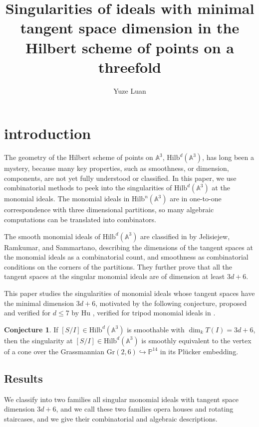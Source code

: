 \documentclass{amsart}[10pt]
\title{Singularities of ideals with minimal tangent space dimension in the Hilbert scheme of points on a threefold}
\author{Yuze Luan}
\theoremstyle{plain}
\theoremstyle{definition}
\newtheorem{conjecture}[theorem]{Conjecture}
\newcommand{\Hilb}{\mathrm{Hilb}}
\begin{document}
\maketitle


\section{introduction}
The geometry of the Hilbert scheme of points on $\mathbb{A}^3$, $\Hilb^d(\mathbb{A}^3)$, has long been a mystery, because many key properties, such as smoothness, or dimension, components, are not yet fully understood or classified. In this paper, we use combinatorial methods to peek into the singularities of $\Hilb^d(\mathbb{A}^3)$ at the monomial ideals. The monomial ideals in $\Hilb^n(\mathbb{A}^3)$ are in one-to-one correspondence with three dimensional partitions, so many algebraic computations can be translated into combinators.

The smooth monomial ideals of $\Hilb^d(\mathbb{A}^3)$ are classified in \cite{AJR1} by Jelisiejew, Ramkumar, and Sammartano, describing the dimensions of the tangent spaces at the monomial ideals as a combinatorial count, and smoothness as combinatorial conditions on the corners of the partitions. They further prove that all the tangent spaces at the singular monomial ideals are of dimension at least $3d+6$.

This paper studies the singularities of monomial ideals whose tangent spaces have the minimal dimension $3d+6$, motivated by the following conjecture, proposed and verified for $d \leq 7$ by Hu \cite{Hu}, verified for tripod monomial ideals in \cite{AJR1}.

\begin{conjecture} \cite{Hu}
\label{Hu}
If $[S/I] \in \Hilb^d(\mathbb{A}^3)$ is smoothable with $\dim_k T(I)=3d+6$, then the singularity at $[S/I] \in \Hilb^d(\mathbb{A}^3)$ is smoothly equivalent to the vertex of a cone over the Grassmannian
$\mathrm{Gr}(2,6) \hookrightarrow \mathbb{P}^{14}$ in its Pl\"ucker embedding.
\end{conjecture}
 
\subsection{Results}
We classify into two families all singular monomial ideals with tangent space dimension $3d+6$, and we call these two families opera houses and rotating staircases, and we give their combinatorial and algebraic descriptions.
\end{document}
